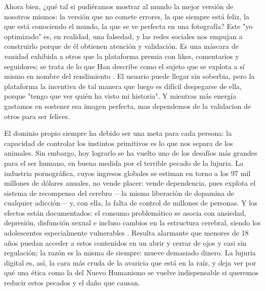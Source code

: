 Ahora bien, ¿qué tal si pudiéramos mostrar al mundo la mejor versión de nosotros mismos: la versión que no comete errores, la que siempre está feliz, la que está conociendo el mundo, la que se ve perfecta en una fotografía? Este "yo optimizado" es, en realidad, una falsedad, y las redes sociales nos empujan a construirlo porque de él obtienen atención y validación. Es una máscara de vanidad exhibida a otros que la plataforma premia con likes, comentarios y seguidores; se trata de lo que Han describe como el sujeto que se explota a sí mismo en nombre del rendimiento \parencite{han2012}. El usuario puede llegar sin soberbia, pero la plataforma la incentiva de tal manera que luego es difícil despegarse de ella, porque "tengo que ver quién ha visto mi historia". Y mientras más energía gastamos en sostener esa imagen perfecta, mas dependemos de la validacion de otros para ser felices.


El dominio propio siempre ha debido ser una meta para cada persona: la capacidad de controlar los instintos primitivos es lo que nos separa de los animales. Sin embargo, hoy lograrlo se ha vuelto uno de los desafíos más grandes para el ser humano, en buena medida por el terrible pecado de la lujuria. La industria pornográfica, cuyos ingresos globales se estiman en torno a los 97 mil millones de dólares anuales, no vende placer: vende dependencia, pues explota el sistema de recompensa del cerebro —la misma liberación de dopamina de cualquier adicción— y, con ella, la falta de control de millones de personas. Y los efectos están documentados: el consumo problemático se asocia con ansiedad, depresión, disfunción sexual e incluso cambios en la estructura cerebral, siendo los adolescentes especialmente vulnerables \parencite{jha2022}. Resulta alarmante que menores de 18 años puedan acceder a estos contenidos en un abrir y cerrar de ojos y casi sin regulación; la razón es la misma de siempre: mueve demasiado dinero. La lujuria digital es, así, la cara más cruda de la avaricia que está en la raíz, y deja ver por qué una ética como la del Nuevo Humanismo se vuelve indispensable si queremos reducir estos pecados y el daño que causan.


